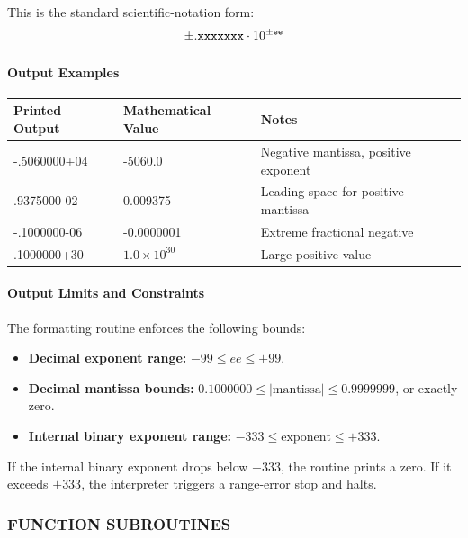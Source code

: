 \medskip
This is the standard scientific-notation form:
\begin{equation*}
\pm\text{.\texttt{xxxxxxx}} \cdot 10^{\pm\text{\texttt{ee}}}
\end{equation*}

\paragraph{Output Examples}

\begin{center}
\small
\ttfamily
\begin{tabularx}{\textwidth}{llX}
\toprule
\textbf{Printed Output} & \textbf{Mathematical Value} & \textbf{Notes} \\
\midrule
-.5060000+04            & -5060.0                     & Negative mantissa, positive exponent \\
\phantom{-}.9375000-02  & 0.009375                    & Leading space for positive mantissa \\
-.1000000-06            & -0.0000001                  & Extreme fractional negative \\
\phantom{-}.1000000+30  & $1.0 \times 10^{30}$        & Large positive value \\
\bottomrule
\end{tabularx}
\end{center}

\paragraph{Output Limits and Constraints}
The formatting routine enforces the following bounds:
\begin{itemize}
	\item \textbf{Decimal exponent range:} $-99 \le ee \le +99$.
	\item \textbf{Decimal mantissa bounds:} $0.1000000 \le \lvert\text{mantissa}\rvert \le 0.9999999$, or exactly zero.
	\item \textbf{Internal binary exponent range:} $-333 \le \text{exponent} \le +333$.
\end{itemize}

If the internal binary exponent drops below $-333$, the routine prints a zero. If it exceeds $+333$, the interpreter triggers a range-error stop and halts.

\subsubsection*{FUNCTION SUBROUTINES}

